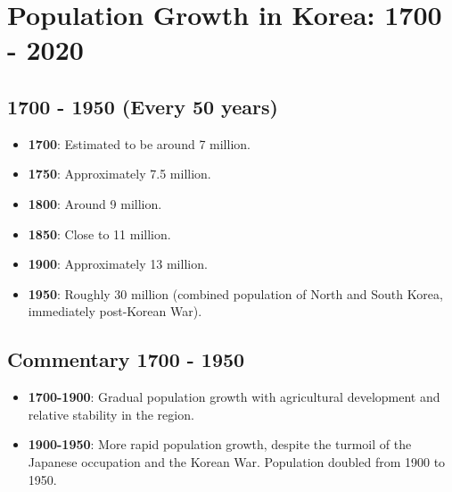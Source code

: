 \section*{Population Growth in Korea: 1700 - 2020}

\subsection*{1700 - 1950 (Every 50 years)}
\begin{itemize}
    \item \textbf{1700}: Estimated to be around 7 million.
    \item \textbf{1750}: Approximately 7.5 million.
    \item \textbf{1800}: Around 9 million.
    \item \textbf{1850}: Close to 11 million.
    \item \textbf{1900}: Approximately 13 million.
    \item \textbf{1950}: Roughly 30 million (combined population of North and South Korea, immediately post-Korean War).
\end{itemize}

\subsection*{Commentary 1700 - 1950}
\begin{itemize}
    \item \textbf{1700-1900}: Gradual population growth with agricultural development and relative stability in the region.
    \item \textbf{1900-1950}: More rapid population growth, despite the turmoil of the Japanese occupation and the Korean War. Population doubled from 1900 to 1950.
\end{itemize}

